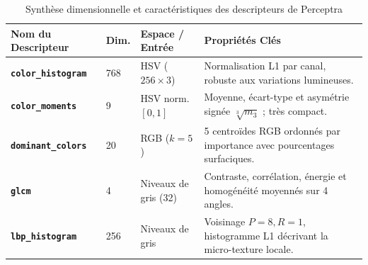 \begin{table}[H]
\centering
{}
\begin{tabularx}{\textwidth}{>{\bfseries}p{3.5cm}p{1.8cm}p{2.5cm}X}
\toprule
\rowcolor{TableHeader}
\color{white}Nom du Descripteur & \color{white}Dim. & \color{white}Espace / Entrée & \color{white}Propriétés Clés \\
\midrule
\texttt{color\_histogram} & 768 & HSV ($256 \times 3$) & Normalisation L1 par canal, robuste aux variations lumineuses. \\
\texttt{color\_moments} & 9 & HSV norm. $[0, 1]$ & Moyenne, écart-type et asymétrie signée $\sqrt[3]{m_3}$ ; très compact. \\
\texttt{dominant\_colors} & 20 & RGB ($k=5$) & 5 centroïdes RGB ordonnés par importance avec pourcentages surfaciques. \\
\texttt{glcm} & 4 & Niveaux de gris (32) & Contraste, corrélation, énergie et homogénéité moyennés sur 4 angles. \\
\texttt{lbp\_histogram} & 256 & Niveaux de gris & Voisinage $P=8, R=1$, histogramme L1 décrivant la micro-texture locale. \\
\bottomrule
\end{tabularx}
\caption{Synthèse dimensionnelle et caractéristiques des descripteurs de Perceptra}
\label{tab:descripteurs_synthese}
\end{table}
